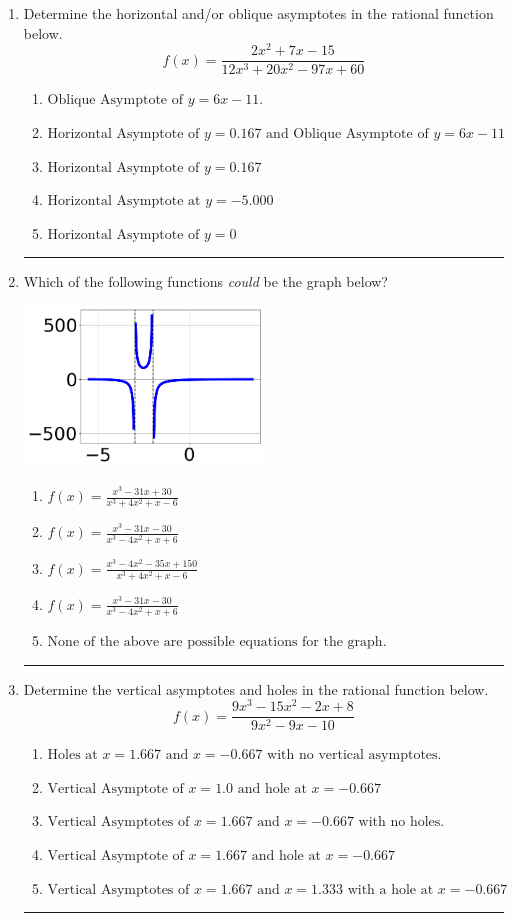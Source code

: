 \documentclass[14pt]{extbook}
\newcommand{\litem}[1]{\item#1\hspace*{-1cm}\rule{\textwidth}{0.4pt}}
\begin{document}
\begin{enumerate}
{\begin{enumerate}[label=\Alph*.]
\end{enumerate} }
\litem{
Determine the horizontal and/or oblique asymptotes in the rational function below.\[ f(x) = \frac{2x^{2} +7 x -15}{12x^{3} +20 x^{2} -97 x + 60} \]\begin{enumerate}[label=\Alph*.]
\item \( \text{Oblique Asymptote of } y = 6x -11. \)
\item \( \text{Horizontal Asymptote of } y = 0.167 \text{ and Oblique Asymptote of } y = 6x -11 \)
\item \( \text{Horizontal Asymptote of } y = 0.167  \)
\item \( \text{Horizontal Asymptote at } y = -5.000 \)
\item \( \text{Horizontal Asymptote of } y = 0 \)

\end{enumerate} }
\litem{
Which of the following functions \textit{could} be the graph below?
\begin{center}
    \includegraphics[width=0.5\textwidth]{../Figures/identifyGraphOfRationalFunctionCopyC.png}
\end{center}
\begin{enumerate}[label=\Alph*.]
\item \( f(x)=\frac{x^{3} -31 x + 30}{x^{3} +4 x^{2} +x -6} \)
\item \( f(x)=\frac{x^{3} -31 x -30}{x^{3} -4 x^{2} +x + 6} \)
\item \( f(x)=\frac{x^{3} -4 x^{2} -35 x + 150}{x^{3} +4 x^{2} +x -6} \)
\item \( f(x)=\frac{x^{3} -31 x -30}{x^{3} -4 x^{2} +x + 6} \)
\item \( \text{None of the above are possible equations for the graph.} \)

\end{enumerate} }
\litem{
Determine the vertical asymptotes and holes in the rational function below.\[ f(x) = \frac{9x^{3} -15 x^{2} -2 x + 8}{9x^{2} -9 x -10} \]\begin{enumerate}[label=\Alph*.]
\item \( \text{Holes at } x = 1.667 \text{ and } x = -0.667 \text{ with no vertical asymptotes.} \)
\item \( \text{Vertical Asymptote of } x = 1.0 \text{ and hole at } x = -0.667 \)
\item \( \text{Vertical Asymptotes of } x = 1.667 \text{ and } x = -0.667 \text{ with no holes.} \)
\item \( \text{Vertical Asymptote of } x = 1.667 \text{ and hole at } x = -0.667 \)
\item \( \text{Vertical Asymptotes of } x = 1.667 \text{ and } x = 1.333 \text{ with a hole at } x = -0.667 \)


\end{enumerate}}
\end{enumerate}
\end{document}
